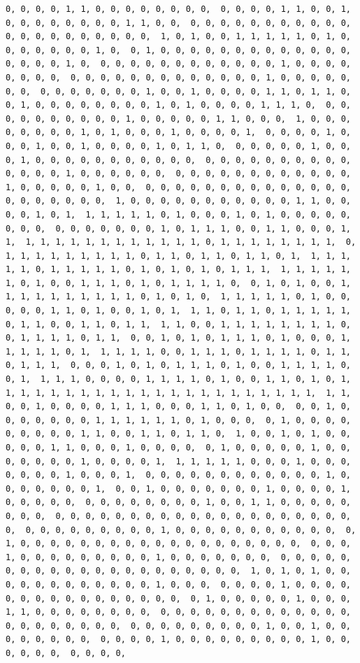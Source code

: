 \documentclass[
]{article}
\begin{document}
\begin{verbatim}
0, 0, 0, 0, 1, 1, 0, 0, 0, 0, 0, 0, 0, 0,  0, 0, 0, 0, 1, 1, 0, 0, 1, 0, 0, 0, 0, 0, 0, 0, 0, 1, 1, 0, 0,  0, 0, 0, 0, 0, 0, 0, 0, 0, 0, 0, 0, 0, 0, 0, 0, 0, 0, 0, 0, 0,  1, 0, 1, 0, 0, 1, 1, 1, 1, 1, 0, 1, 0, 0, 0, 0, 0, 0, 0, 1, 0,  0, 1, 0, 0, 0, 0, 0, 0, 0, 0, 0, 0, 0, 0, 0, 0, 0, 0, 0, 1, 0,  0, 0, 0, 0, 0, 0, 0, 0, 0, 0, 0, 0, 1, 0, 0, 0, 0, 0, 0, 0, 0,  0, 0, 0, 0, 0, 0, 0, 0, 0, 0, 0, 0, 0, 1, 0, 0, 0, 0, 0, 0, 0,  0, 0, 0, 0, 0, 0, 0, 1, 0, 0, 1, 0, 0, 0, 0, 1, 1, 0, 1, 1, 0,  0, 1, 0, 0, 0, 0, 0, 0, 0, 0, 1, 0, 1, 0, 0, 0, 0, 1, 1, 1, 0,  0, 0, 0, 0, 0, 0, 0, 0, 0, 0, 1, 0, 0, 0, 0, 0, 1, 1, 0, 0, 0,  1, 0, 0, 0, 0, 0, 0, 0, 0, 1, 0, 1, 0, 0, 0, 1, 0, 0, 0, 0, 1,  0, 0, 0, 0, 1, 0, 0, 0, 1, 0, 0, 1, 0, 0, 0, 0, 1, 0, 1, 1, 0,  0, 0, 0, 0, 0, 1, 0, 0, 0, 1, 0, 0, 0, 0, 0, 0, 0, 0, 0, 0, 0,  0, 0, 0, 0, 0, 0, 0, 0, 0, 0, 0, 0, 0, 0, 1, 0, 0, 0, 0, 0, 0,  0, 0, 0, 0, 0, 0, 0, 0, 0, 0, 0, 0, 1, 0, 0, 0, 0, 0, 1, 0, 0,  0, 0, 0, 0, 0, 0, 0, 0, 0, 0, 0, 0, 0, 0, 0, 0, 0, 0, 0, 0, 0,  1, 0, 0, 0, 0, 0, 0, 0, 0, 0, 0, 0, 1, 1, 0, 0, 0, 0, 1, 0, 1,  1, 1, 1, 1, 1, 0, 1, 0, 0, 0, 1, 0, 1, 0, 0, 0, 0, 0, 0, 0, 0,  0, 0, 0, 0, 0, 0, 0, 1, 0, 1, 1, 1, 0, 0, 1, 1, 0, 0, 0, 1, 1,  1, 1, 1, 1, 1, 1, 1, 1, 1, 1, 1, 1, 0, 1, 1, 1, 1, 1, 1, 1, 1,  0, 1, 1, 1, 1, 1, 1, 1, 1, 1, 0, 1, 1, 0, 1, 1, 0, 1, 1, 0, 1,  1, 1, 1, 1, 1, 0, 1, 1, 1, 1, 1, 0, 1, 0, 1, 0, 1, 0, 1, 1, 1,  1, 1, 1, 1, 1, 1, 0, 1, 0, 0, 1, 1, 1, 0, 1, 0, 1, 1, 1, 1, 0,  0, 1, 0, 1, 0, 0, 1, 1, 1, 1, 1, 1, 1, 1, 1, 1, 0, 1, 0, 1, 0,  1, 1, 1, 1, 1, 0, 1, 0, 0, 0, 0, 0, 1, 1, 0, 1, 0, 0, 1, 0, 1,  1, 1, 0, 1, 1, 0, 1, 1, 1, 1, 1, 0, 1, 1, 0, 0, 1, 1, 0, 1, 1,  1, 1, 0, 0, 1, 1, 1, 1, 1, 1, 1, 1, 0, 0, 1, 1, 1, 1, 0, 1, 1,  0, 0, 1, 0, 1, 0, 1, 1, 1, 0, 1, 0, 0, 0, 1, 1, 1, 1, 1, 0, 1,  1, 1, 1, 1, 0, 0, 1, 1, 1, 0, 1, 1, 1, 1, 0, 1, 1, 0, 1, 1, 1,  0, 0, 0, 1, 0, 1, 0, 1, 1, 1, 0, 1, 0, 0, 1, 1, 1, 1, 0, 0, 1,  1, 1, 1, 0, 0, 0, 0, 1, 1, 1, 1, 0, 1, 0, 0, 1, 1, 0, 1, 0, 1,  1, 1, 1, 1, 1, 1, 1, 1, 1, 1, 1, 1, 1, 1, 1, 1, 1, 1, 1, 1, 1,  1, 1, 0, 0, 1, 0, 0, 0, 0, 1, 1, 1, 0, 0, 0, 1, 1, 0, 1, 0, 0,  0, 0, 1, 0, 0, 0, 0, 0, 0, 0, 1, 1, 1, 1, 1, 1, 0, 1, 0, 0, 0,  0, 1, 0, 0, 0, 0, 0, 0, 0, 0, 0, 1, 1, 0, 0, 1, 1, 0, 1, 1, 0,  1, 0, 0, 1, 0, 1, 0, 0, 0, 0, 0, 1, 1, 0, 0, 0, 1, 0, 0, 0, 0,  0, 1, 0, 0, 0, 0, 0, 1, 0, 0, 0, 0, 0, 0, 0, 1, 0, 0, 0, 0, 1,  1, 1, 1, 1, 1, 0, 0, 0, 1, 0, 0, 0, 0, 0, 0, 0, 1, 0, 0, 0, 1,  0, 0, 0, 0, 0, 0, 0, 0, 0, 0, 0, 0, 1, 0, 0, 0, 0, 0, 0, 0, 1,  0, 0, 1, 0, 0, 0, 0, 0, 0, 0, 1, 0, 0, 0, 0, 1, 0, 0, 0, 0, 0,  0, 0, 0, 0, 0, 0, 0, 0, 1, 0, 0, 1, 1, 0, 0, 0, 0, 0, 0, 0, 0,  0, 0, 0, 0, 0, 0, 0, 0, 0, 0, 0, 0, 0, 0, 0, 0, 0, 0, 0, 0, 0,  0, 0, 0, 0, 0, 0, 0, 0, 0, 1, 0, 0, 0, 0, 0, 0, 0, 0, 0, 0, 0,  0, 1, 0, 0, 0, 0, 0, 0, 0, 0, 0, 0, 0, 0, 0, 0, 0, 0, 0, 0, 0,  0, 0, 0, 1, 0, 0, 0, 0, 0, 0, 0, 0, 0, 1, 0, 0, 0, 0, 0, 0, 0,  0, 0, 0, 0, 0, 0, 0, 0, 0, 0, 0, 0, 0, 0, 0, 0, 0, 0, 0, 0, 0,  1, 0, 1, 0, 1, 0, 0, 0, 0, 0, 0, 0, 0, 0, 0, 0, 0, 1, 0, 0, 0,  0, 0, 0, 0, 1, 0, 0, 0, 0, 0, 0, 0, 0, 0, 0, 0, 0, 0, 0, 0, 0,  0, 1, 0, 0, 0, 0, 0, 1, 0, 0, 0, 1, 1, 0, 0, 0, 0, 0, 0, 0, 0,  0, 0, 0, 0, 0, 0, 0, 0, 0, 0, 0, 0, 0, 0, 0, 0, 0, 0, 0, 0, 0,  0, 0, 0, 0, 0, 0, 0, 0, 0, 1, 0, 0, 1, 0, 0, 0, 0, 0, 0, 0, 0,  0, 0, 0, 0, 1, 0, 0, 0, 0, 0, 0, 0, 0, 0, 1, 0, 0, 0, 0, 0, 0,  0, 0, 0, 0, 
\end{verbatim}
\end{document}
